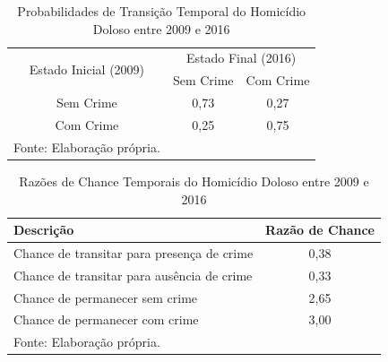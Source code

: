 \documentclass[12pt,openright,oneside,a4paper,english,french,spanish]{abntex2}
\numberwithin{table}{section} %
\numberwithin{figure}{section} %
\begin{document}
\begin{subappendices}
\begin{table}[H]
\centering
\caption{Probabilidades de Transição Temporal do Homicídio Doloso entre 2009 e 2016}
        \begin{tabular}{ccc}
            \hline
            \multirow{2}{*}{Estado Inicial (2009)} & \multicolumn{2}{c}{Estado Final (2016)}  \\\cline{2-3} 
                                     & \multicolumn{1}{l}{Sem Crime} & \multicolumn{1}{l}{Com Crime} \\\hline
            {Sem Crime} & {0,73} & {0,27} \\                \hline
            {Com Crime} & {0,25} & {0,75} \\                \hline
            \tiny Fonte: Elaboração própria.
        \end{tabular}
    \label{tab:prob_tempo_hom_dol_2009_2016}
\end{table}

\begin{table}[H]
\centering
\caption{Razões de Chance Temporais do Homicídio Doloso entre 2009 e 2016}
        \begin{tabular}{lc}
            \hline
            {\textbf{Descrição}} & {\textbf{Razão de Chance}} \\\hline
            {Chance de transitar para presença de crime} & {0,38} \\
            {Chance de transitar para ausência de crime} & {0,33} \\
            {Chance de permanecer sem crime} & {2,65} \\
            {Chance de permanecer com crime} & {3,00} \\\hline
            \tiny Fonte: Elaboração própria.
        \end{tabular}
    \label{tab:odds_tempo_hom_dol_2009_2016}
\end{table}



\end{subappendices}
\end{document}
